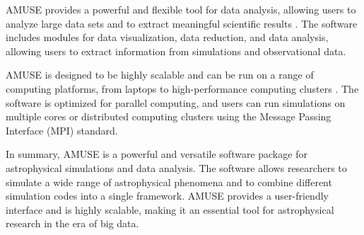 AMUSE provides a powerful and flexible tool for data analysis, allowing users to analyze large data sets and to extract meaningful scientific results \citep{portegies2018astrophysical}. The software includes modules for data visualization, data reduction, and data analysis, allowing users to extract information from simulations and observational data.

AMUSE is designed to be highly scalable and can be run on a range of computing platforms, from laptops to high-performance computing clusters \citep{pelupessy2013astrophysical}. The software is optimized for parallel computing, and users can run simulations on multiple cores or distributed computing clusters using the Message Passing Interface (MPI) standard.

In summary, AMUSE is a powerful and versatile software package for astrophysical simulations and data analysis. The software allows researchers to simulate a wide range of astrophysical phenomena and to combine different simulation codes into a single framework. AMUSE provides a user-friendly interface and is highly scalable, making it an essential tool for astrophysical research in the era of big data.

